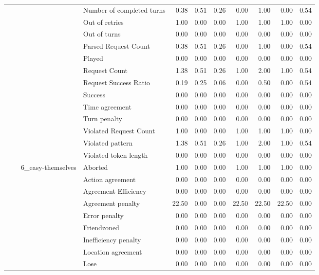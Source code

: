 \begin{tabular}{llllrrrrrrr}
 &  &  & Number of completed turns & 0.38 & 0.51 & 0.26 & 0.00 & 1.00 & 0.00 & 0.54 \\
 &  &  & Out of retries & 1.00 & 0.00 & 0.00 & 1.00 & 1.00 & 1.00 & 0.00 \\
 &  &  & Out of turns & 0.00 & 0.00 & 0.00 & 0.00 & 0.00 & 0.00 & 0.00 \\
 &  &  & Parsed Request Count & 0.38 & 0.51 & 0.26 & 0.00 & 1.00 & 0.00 & 0.54 \\
 &  &  & Played & 0.00 & 0.00 & 0.00 & 0.00 & 0.00 & 0.00 & 0.00 \\
 &  &  & Request Count & 1.38 & 0.51 & 0.26 & 1.00 & 2.00 & 1.00 & 0.54 \\
 &  &  & Request Success Ratio & 0.19 & 0.25 & 0.06 & 0.00 & 0.50 & 0.00 & 0.54 \\
 &  &  & Success & 0.00 & 0.00 & 0.00 & 0.00 & 0.00 & 0.00 & 0.00 \\
 &  &  & Time agreement & 0.00 & 0.00 & 0.00 & 0.00 & 0.00 & 0.00 & 0.00 \\
 &  &  & Turn penalty & 0.00 & 0.00 & 0.00 & 0.00 & 0.00 & 0.00 & 0.00 \\
 &  &  & Violated Request Count & 1.00 & 0.00 & 0.00 & 1.00 & 1.00 & 1.00 & 0.00 \\
 &  &  & Violated pattern & 1.38 & 0.51 & 0.26 & 1.00 & 2.00 & 1.00 & 0.54 \\
 &  &  & Violated token length & 0.00 & 0.00 & 0.00 & 0.00 & 0.00 & 0.00 & 0.00 \\
\cline{3-11}
 &  & \multirow[t]{27}{*}{6_easy-themselves} & Aborted & 1.00 & 0.00 & 0.00 & 1.00 & 1.00 & 1.00 & 0.00 \\
 &  &  & Action agreement & 0.00 & 0.00 & 0.00 & 0.00 & 0.00 & 0.00 & 0.00 \\
 &  &  & Agreement Efficiency & 0.00 & 0.00 & 0.00 & 0.00 & 0.00 & 0.00 & 0.00 \\
 &  &  & Agreement penalty & 22.50 & 0.00 & 0.00 & 22.50 & 22.50 & 22.50 & 0.00 \\
 &  &  & Error penalty & 0.00 & 0.00 & 0.00 & 0.00 & 0.00 & 0.00 & 0.00 \\
 &  &  & Friendzoned & 0.00 & 0.00 & 0.00 & 0.00 & 0.00 & 0.00 & 0.00 \\
 &  &  & Inefficiency penalty & 0.00 & 0.00 & 0.00 & 0.00 & 0.00 & 0.00 & 0.00 \\
 &  &  & Location agreement & 0.00 & 0.00 & 0.00 & 0.00 & 0.00 & 0.00 & 0.00 \\
 &  &  & Lose & 0.00 & 0.00 & 0.00 & 0.00 & 0.00 & 0.00 & 0.00 \\

\end{tabular}
